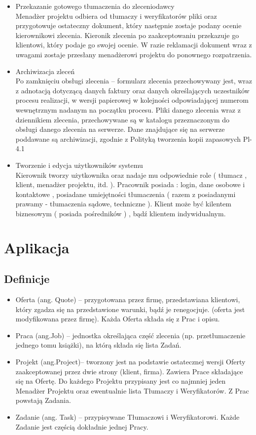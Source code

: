 \documentclass[licencjacka]{pracamgr}
\begin{document}
\begin{itemize}
\item Przekazanie gotowego tłumaczenia do zleceniodawcy\\
Menadżer projektu odbiera od tłumaczy i weryfikatorów pliki oraz przygotowuje ostateczny dokument, który następnie zostaje podany ocenie kierownikowi zlecenia.
Kieronik zlecenia po zaakceptowaniu przekazuje go klientowi, który podaje go swojej ocenie. W razie reklamacji dokument wraz z uwagami zostaje przesłany 
menadżerowi projektu do ponownego rozpatrzenia.

\item Archiwizacja zleceń\\
Po zamknięciu obsługi zlecenia – formularz zlecenia przechowywany jest,
wraz z adnotacją dotyczącą danych faktury oraz danych określających uczestników 
procesu realizacji, w wersji papierowej w kolejności odpowiadającej numerom 
wewnętrznym nadanym na początku procesu.
Pliki danego zlecenia wraz z dziennikiem zlecenia, przechowywane są w 
katalogu przeznaczonym do obsługi danego zlecenia na serwerze.
Dane znajdujące się na serwerze poddawane są archiwizacji, zgodnie z 
Polityką tworzenia kopii zapasowych Pl-4.1

\item Tworzenie i edycja użytkowników systemu\\
Kierownik tworzy użytkownika oraz nadaje mu odpowiednie role ( tłumacz , klient, menadżer projektu, itd. ).
Pracownik posiada : login, dane osobowe i kontaktowe , posiadane umiejętności tłumaczenia ( razem z posiadanymi prawamy - tłumaczenia sądowe, techniczne ).
Klient może być kilentem biznesowym ( posiada pośredników ) , bądź klientem indywidualnym.

\end{itemize}

\chapter{Aplikacja}

\section{Definicje}
\begin{itemize}
\item Oferta (ang. Quote) – przygotowana przez firmę, przedstawiana klientowi, który zgadza się na przedstawione warunki, bądź je renegocjuje. (oferta jest modyfikowana przez firmę). Każda Oferta składa się z Prac i opisu.
\item Praca (ang.Job) – jednostka określająca część zlecenia (np. przetłumaczenie jednego tomu książki), na którą składa się lista Zadań.
\item Projekt (ang.Project)– tworzony jest na podstawie ostatecznej wersji Oferty zaakceptowanej przez dwie strony (klient, firma). Zawiera Prace składające się na Ofertę. Do każdego Projektu przypisany jest co najmniej jeden Menadżer Projektu oraz ewentualnie lista Tłumaczy i Weryfikatorów. Z Prac powstają Zadania.
\item Zadanie (ang. Task) – przypisywane Tłumaczowi i Weryfikatorowi. Każde Zadanie jest częścią dokładnie jednej Pracy.
\end{itemize}
\end{document}
